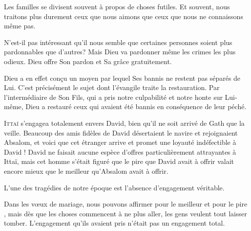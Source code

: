 Les familles se divisent souvent à propos de choses futiles.
 Et souvent, nous traitons plus durement ceux que nous aimons
 que ceux que nous ne connaissons même pas. 

N'est-il pas intéressant qu'il nous semble que certaines personnes
 soient plus pardonnables que d'autres?
 Mais Dieu va pardonner même les crimes les plus odieux.
 Dieu offre Son pardon et Sa grâce gratuitement. 


Dieu a en effet con\c{c}u un moyen par lequel \Og Ses bannis \Fg{}
 ne restent pas séparés de Lui.
 C'est précisément le sujet dont l'évangile traite \ocadr la restauration.
 Par l'intermédiaire de Son Fils, qui a pris notre culpabilité et notre honte
 sur Lui-même, Dieu a restauré ceux qui avaient été bannis en conséquence
 de leur péché. 

\dvrule






\lettrine{I}{ttaï} s'engagea totalement envers David,
 bien qu'il ne soit arrivé de Gath que la veille.
 Beaucoup des amis fidèles de David désertaient le navire
 et rejoignaient Absalom, et voici que cet étranger arrive
 et promet une loyauté indéfectible à David !
 David ne faisait aucune espèce d'offres particulièrement attrayantes
 à Ittaï, mais cet homme s'était figuré que le pire que David avait
 à offrir valait encore mieux que le meilleur qu'Absalom avait à offrir.

L'une des tragédies de notre époque est l'absence d'engagement véritable. 


Dans les v\oe{}ux de mariage, nous pouvons affirmer
 \Og pour le meilleur et pour le pire \Fg{}, mais dès que les choses
 commencent à ne plus aller, les gens veulent tout laisser tomber.
 L'engagement qu'ils avaient pris n'était pas un engagement total. 

